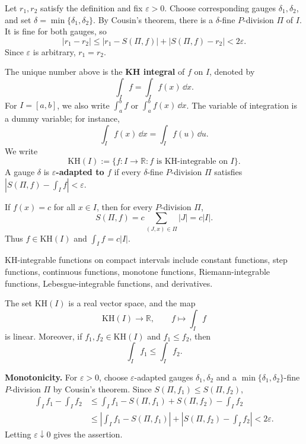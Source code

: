 \begin{proofenv}
Let $r_1,r_2$ satisfy the definition and fix $\varepsilon>0$.
Choose corresponding gauges $\delta_1,\delta_2$, and set
$\delta=\min\{\delta_1,\delta_2\}$. By Cousin's theorem, there is a
$\delta$-fine $P$-division $\Pi$ of $I$. It is fine for both gauges, so
\[
    |r_1-r_2|
    \le |r_1-S(\Pi,f)|+|S(\Pi,f)-r_2|<2\varepsilon.
\]
Since $\varepsilon$ is arbitrary, $r_1=r_2$.
\end{proofenv}

\begin{notationenv}
The unique number above is the \textbf{KH integral} of $f$ on $I$, denoted by
\[
    \int_I f=\int_I f(x)\,\dd x.
\]
For $I=[a,b]$, we also write $\int_a^b f$ or $\int_a^b f(x)\,\dd x$.
The variable of integration is a dummy variable; for instance,
\[
    \int_I f(x)\,\dd x=\int_I f(u)\,\dd u.
\]
We write
\[
    \mathrm{KH}(I):=\{f:I\to\mathbb R:f\text{ is KH-integrable on }I\}.
\]
A gauge $\delta$ is \textbf{$\varepsilon$-adapted to $f$} if every
$\delta$-fine $P$-division $\Pi$ satisfies
$|S(\Pi,f)-\int_I f|<\varepsilon$.
\end{notationenv}

\begin{exampleenv}
If $f(x)=c$ for all $x\in I$, then for every $P$-division $\Pi$,
\[
    S(\Pi,f)=c\sum_{(J,x)\in\Pi}|J|=c|I|.
\]
Thus $f\in\mathrm{KH}(I)$ and $\int_I f=c|I|$.
\end{exampleenv}

\begin{remark}
KH-integrable functions on compact intervals include constant functions,
step functions, continuous functions, monotone functions,
Riemann-integrable functions, Lebesgue-integrable functions, and derivatives.
\end{remark}

\begin{theoremenv}\label{thm:kh-linearity-monotonicity}
The set $\mathrm{KH}(I)$ is a real vector space, and the map
\[
    \mathrm{KH}(I)\longrightarrow\mathbb R,
    \qquad f\longmapsto\int_I f
\]
is linear. Moreover, if $f_1,f_2\in\mathrm{KH}(I)$ and $f_1\le f_2$, then
\[
    \int_I f_1\le\int_I f_2.
\]
\end{theoremenv}

\begin{proofenv}
\textbf{Monotonicity.} For $\varepsilon>0$, choose
$\varepsilon$-adapted gauges $\delta_1,\delta_2$ and a
$\min\{\delta_1,\delta_2\}$-fine $P$-division $\Pi$ by Cousin's theorem.
Since $S(\Pi,f_1)\le S(\Pi,f_2)$,
\[
\begin{aligned}
    \int_I f_1-\int_I f_2
    &\le \int_I f_1-S(\Pi,f_1)+S(\Pi,f_2)-\int_I f_2\\
    &\le\left|\int_I f_1-S(\Pi,f_1)\right|
       +\left|S(\Pi,f_2)-\int_I f_2\right|<2\varepsilon.
\end{aligned}
\]
Letting $\varepsilon\downarrow0$ gives the assertion.
\end{proofenv}


